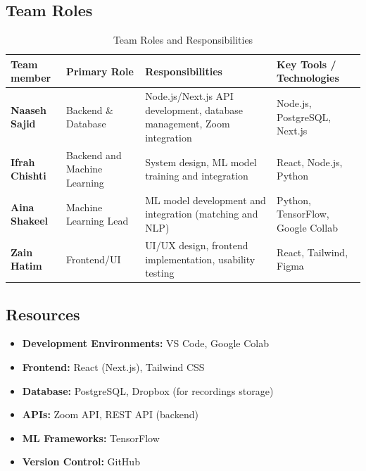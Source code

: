 \subsection{Team Roles}
\begin{table}[ht!]
\centering
\renewcommand{\arraystretch}{1.2}
\small
\begin{tabular}{|p{3.3cm}|p{3.2cm}|p{6.8cm}|p{2.5cm}|}
\hline
\textbf{Team member} & \textbf{Primary Role} & \textbf{Responsibilities} & \textbf{Key Tools / Technologies} \\ \hline

\textbf{Naaseh Sajid} & Backend \& Database & Node.js/Next.js API development, database management, Zoom integration & Node.js, PostgreSQL, Next.js \\ \hline

\textbf{Ifrah Chishti} & Backend and Machine Learning & System design, ML model training and integration & React, Node.js, Python \\ \hline

\textbf{Aina Shakeel} & Machine Learning Lead & ML model development and integration (matching and NLP) & Python, TensorFlow, Google Collab \\ \hline

\textbf{Zain Hatim} & Frontend/UI  & UI/UX design, frontend implementation, usability testing & React, Tailwind, Figma \\ \hline

\end{tabular}
\caption{Team Roles and Responsibilities}
\label{tab:team_roles}
\end{table}

\newpage
\subsection{Resources}
\begin{itemize}
    \item \textbf{Development Environments:} VS Code, Google Colab
    \item \textbf{Frontend:} React (Next.js), Tailwind CSS
    \item \textbf{Database:} PostgreSQL, Dropbox (for recordings storage)
    \item \textbf{APIs:} Zoom API, REST API (backend)
    \item \textbf{ML Frameworks:} TensorFlow
    \item \textbf{Version Control:} GitHub
\end{itemize}

